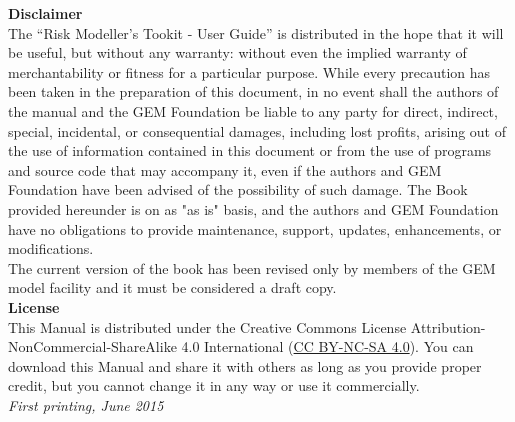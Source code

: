 \documentclass[11pt,fleqn]{book} %
\begin{document}
   {\bf{Disclaimer}} \hfill \\
\noindent
   The ``Risk Modeller's Tookit - User Guide'' is distributed in the hope 
   that it will be useful, but without any warranty: without 
   even the implied warranty of merchantability or fitness for a 
   particular purpose. While every 
   precaution has been taken in the preparation of this document, in 
   no event shall the authors of the manual and the GEM Foundation be 
   liable to any party for direct, indirect, special, incidental, or 
   consequential damages, including lost profits, arising out of the 
   use of information contained in this document or from the use of 
   programs and source code that may accompany it, even if the authors 
   and GEM Foundation have been advised of the possibility of such damage. 
   The Book provided hereunder is on as "as is" basis, and the authors 
   and GEM Foundation have no obligations to provide maintenance, support,
   updates, enhancements, or modifications. 
   \hfill \\
   The current version of the book has been revised only by members of 
   the GEM model facility and it must be considered a draft copy. 
   \vspace{0.4cm} \hfill \\
   {\bf{License}} \hfill \\
   This Manual is distributed under the Creative Commons License 
   Attribution-NonCommercial-ShareAlike 4.0 International 
   (\href{http://creativecommons.org/licenses/by-nc-sa/4.0/}
   {CC BY-NC-SA 4.0}). 
   You can download this Manual and share it with 
   others as long as you provide proper credit, but you cannot change 
   it in any way or use it commercially.\hfill \\

\noindent \textit{First printing, June 2015} %


\pagestyle{empty} %
\tableofcontents %
\cleardoublepage %
\pagestyle{fancy} %

\end{document}
